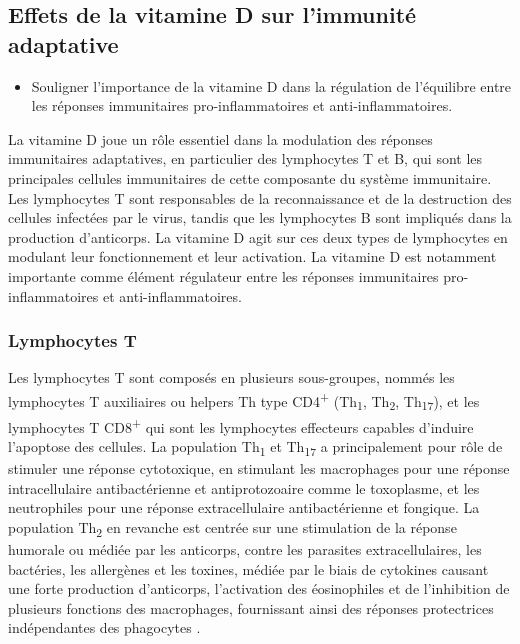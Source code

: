 \documentclass[
  a4paper,
  DIV=11,
  numbers=noendperiod,
  listof=totoc]{scrreprt}
\providecommand{\tightlist}{%
  \setlength{\itemsep}{0pt}\setlength{\parskip}{0pt}}\usepackage{longtable,booktabs,array}
\begin{document}
\hypertarget{effets-de-la-vitamine-d-sur-limmunituxe9-adaptative}{%
\subsection{Effets de la vitamine D sur l'immunité
adaptative}\label{effets-de-la-vitamine-d-sur-limmunituxe9-adaptative}}

\begin{itemize}
\tightlist
\item
  Souligner l'importance de la vitamine D dans la régulation de
  l'équilibre entre les réponses immunitaires pro-inflammatoires et
  anti-inflammatoires.
\end{itemize}

La vitamine D joue un rôle essentiel dans la modulation des réponses
immunitaires adaptatives, en particulier des lymphocytes T et B, qui
sont les principales cellules immunitaires de cette composante du
système immunitaire. Les lymphocytes T sont responsables de la
reconnaissance et de la destruction des cellules infectées par le virus,
tandis que les lymphocytes B sont impliqués dans la production
d'anticorps. La vitamine D agit sur ces deux types de lymphocytes en
modulant leur fonctionnement et leur activation. La vitamine D est
notamment importante comme élément régulateur entre les réponses
immunitaires pro-inflammatoires et anti-inflammatoires.

\hypertarget{lymphocytes-t}{%
\subsubsection{Lymphocytes T}\label{lymphocytes-t}}

Les lymphocytes T sont composés en plusieurs sous-groupes, nommés les
lymphocytes T auxiliaires ou helpers \acs{Th} type
CD4\textsuperscript{+} (Th\textsubscript{1}, Th\textsubscript{2},
Th\textsubscript{17}), et les lymphocytes T CD8\textsuperscript{+} qui
sont les lymphocytes effecteurs capables d'induire l'apoptose des
cellules. La population Th\textsubscript{1} et Th\textsubscript{17} a
principalement pour rôle de stimuler une réponse cytotoxique, en
stimulant les macrophages pour une réponse intracellulaire
antibactérienne et antiprotozoaire comme le toxoplasme, et les
neutrophiles pour une réponse extracellulaire antibactérienne et
fongique. La population Th\textsubscript{2} en revanche est centrée sur
une stimulation de la réponse humorale ou médiée par les anticorps,
contre les parasites extracellulaires, les bactéries, les allergènes et
les toxines, médiée par le biais de cytokines causant une forte
production d'anticorps, l'activation des éosinophiles et de l'inhibition
de plusieurs fonctions des macrophages, fournissant ainsi des réponses
protectrices indépendantes des phagocytes \autocite{Walker.2018}.
\end{document}
